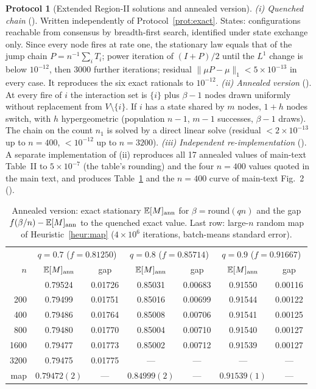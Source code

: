 \documentclass[aps,pre,onecolumn,superscriptaddress,amsmath,amssymb,longbibliography]{revtex4-2}
\theoremstyle{definition}
\newtheorem{protocol}[theorem]{Protocol}
\theoremstyle{remark}
\newcommand{\E}{\mathbb{E}}
\begin{document}
\begin{protocol}[Extended Region-II solutions and annealed version]
\label{prot:ext}
\emph{(i) Quenched chain} (). Written
independently of Protocol~\ref{prot:exact}. States: configurations
reachable from consensus by breadth-first search, identified under state
exchange only. Since every node fires at rate one, the stationary law
equals that of the jump chain $P=n^{-1}\sum_iT_i$; power iteration of
$(I+P)/2$ until the $L^1$ change is below $10^{-12}$, then 3000 further
iterations; residual $\|\mu P-\mu\|_1<5\times10^{-13}$ in every case. It
reproduces the six exact rationals to $10^{-12}$.
\emph{(ii) Annealed version} (). At
every fire of $i$ the interaction set is $\{i\}$ plus $\beta-1$ nodes
drawn uniformly without replacement from $V\setminus\{i\}$. If $i$ has a
state shared by $m$ nodes, $1+h$ nodes switch, with $h$ hypergeometric
(population $n-1$, $m-1$ successes, $\beta-1$ draws). The chain on the
count $n_1$ is solved by a direct linear solve (residual
$<2\times10^{-13}$ up to $n=400$, $<10^{-12}$ up to $n=3200$).
\emph{(iii) Independent re-implementation}
(). A separate implementation of (ii)
reproduces all 17 annealed values of main-text Table~II to
$5\times10^{-7}$ (the table's rounding) and the four $n=400$ values
quoted in the main text, and produces Table~\ref{tab:sizescan} and the
$n=400$ curve of main-text Fig.~2 ().
\end{protocol}

\begin{table}[t]
\caption{Annealed version: exact stationary $\E[M]_{\rm ann}$ for
$\beta=\mathrm{round}(qn)$ and the gap $f(\beta/n)-\E[M]_{\rm ann}$ to the
quenched exact value. Last row: large-$n$ random map of
Heuristic~\ref{heur:map} ($4\times10^6$ iterations, batch-means standard
error).}
\label{tab:sizescan}
\begin{ruledtabular}
\begin{tabular}{rcccccc}
 & \multicolumn{2}{c}{$q=0.7$ ($f=0.81250$)} & \multicolumn{2}{c}{$q=0.8$ ($f=0.85714$)} & \multicolumn{2}{c}{$q=0.9$ ($f=0.91667$)}\\
$n$ & $\E[M]_{\rm ann}$ & gap & $\E[M]_{\rm ann}$ & gap & $\E[M]_{\rm ann}$ & gap\\
\colrule
100  & 0.79524 & 0.01726 & 0.85031 & 0.00683 & 0.91550 & 0.00116\\
200  & 0.79499 & 0.01751 & 0.85016 & 0.00699 & 0.91544 & 0.00122\\
400  & 0.79486 & 0.01764 & 0.85008 & 0.00706 & 0.91541 & 0.00125\\
800  & 0.79480 & 0.01770 & 0.85004 & 0.00710 & 0.91540 & 0.00127\\
1600 & 0.79477 & 0.01773 & 0.85002 & 0.00712 & 0.91539 & 0.00127\\
3200 & 0.79475 & 0.01775 & ---     & ---     & ---     & ---\\
map  & $0.79472(2)$ & --- & $0.84999(2)$ & --- & $0.91539(1)$ & ---\\
\end{tabular}
\end{ruledtabular}
\end{table}
\end{document}
